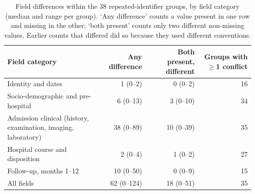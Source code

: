 \begin{table}[htbp]\centering\small
\caption{Field differences within the 38 repeated-identifier groups, by field category (median and range per group). `Any difference' counts a value present in one row and missing in the other; `both present' counts only two different non-missing values. Earlier counts that differed did so because they used different conventions.}\label{tab:dupfields}
\begin{tabular}{>{\raggedright\arraybackslash}p{5.4cm}rrr}
\toprule
Field category & Any difference & Both present, different & Groups with $\ge$1 conflict \\
\midrule
Identity and dates & 1 (0--2) & 0 (0--2) & 16 \\
Socio-demographic and pre-hospital & 6 (0--13) & 3 (0--10) & 34 \\
Admission clinical (history, examination, imaging, laboratory) & 38 (0--89) & 10 (0--39) & 35 \\
Hospital course and disposition & 2 (0--4) & 1 (0--2) & 27 \\
Follow-up, months 1--12 & 10 (0--50) & 0 (0--9) & 15 \\
All fields & 62 (0--124) & 18 (0--51) & 35 \\
\bottomrule
\end{tabular}
\end{table}
